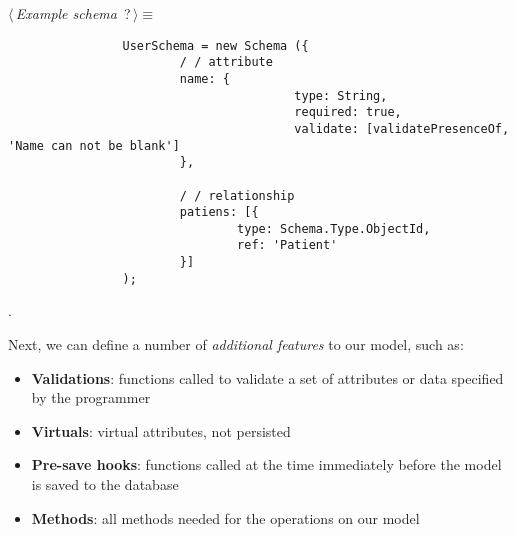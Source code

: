 	\begin{flushleft} \small
\begin{minipage}{\linewidth}\label{scrap1}\raggedright\small
{} $\langle\,${\itshape {Example schema}}\nobreak\ {\footnotesize {?}}$\,\rangle\equiv$
\vspace{-1ex}
\begin{list}{}{} \item

                \begin{lstlisting} 
                UserSchema = new Schema ({
                        / / attribute
                        name: {
                                        type: String,
                                        required: true,
                                        validate: [validatePresenceOf, 'Name can not be blank']
                        },

                        / / relationship
                        patiens: [{
                                type: Schema.Type.ObjectId,
                                ref: 'Patient'
                        }]
                ); 
                \end{lstlisting}
        {\NWsep}
\end{list}
\vspace{-1.5ex}
\footnotesize
\begin{list}{}{\setlength{\itemsep}{-\parsep}\setlength{\itemindent}{-\leftmargin}}
\item {\NWtxtMacroNoRef}.

\item{}
\end{list}
\end{minipage}\vspace{4ex}
\end{flushleft}
Next, we can define a number of \emph{additional features} to our model, such as:

\begin{itemize}
	\item \textbf{Validations}: functions called to validate a set of attributes or data specified by the programmer
	\item \textbf{Virtuals}: virtual attributes, not persisted
	\item \textbf{Pre-save hooks}: functions called at the time immediately before the model is saved to the database
	\item \textbf{Methods}: all methods needed for the operations on our model 
\end{itemize}

